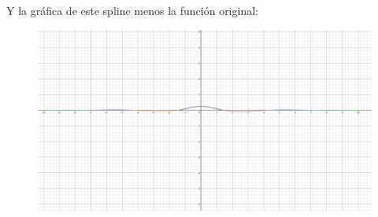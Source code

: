 Y la gráfica de este spline menos la función original:
\begin{figure}[H]
	\centering
	\includegraphics[scale=0.2]{img/2_7dif.png}
\end{figure}


